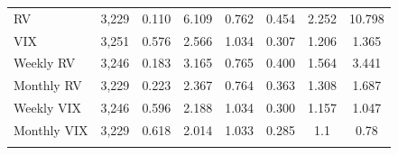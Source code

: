\begin{table}[!htbp]
\begin{tabular}{@{\extracolsep{5pt}}lccccccc}
RV & 3,229 & 0.110 & 6.109 & 0.762 & 0.454 & 2.252 & 10.798\\ 
VIX & 3,251 & 0.576 & 2.566 & 1.034 & 0.307 & 1.206 & 1.365 \\ 
Weekly RV & 3,246 & 0.183 & 3.165 & 0.765 & 0.400 & 1.564 &  3.441\\ 
Monthly RV & 3,229 & 0.223 & 2.367 & 0.764 & 0.363 & 1.308 & 1.687  \\ 
Weekly VIX & 3,246 & 0.596 & 2.188 & 1.034 & 0.300  & 1.157 &  1.047 \\ 
Monthly VIX & 3,229 & 0.618 & 2.014 & 1.033 & 0.285 &  1.1 & 0.78\\ 
\hline \\[-1.8ex] 
\end{tabular} 
\end{table} 



